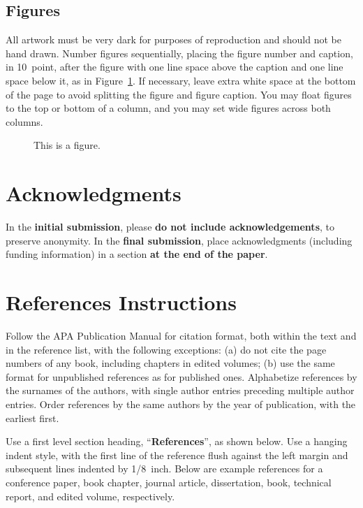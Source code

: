 \documentclass[10pt,letterpaper]{article}
\begin{document}
\subsection{Figures}

All artwork must be very dark for purposes of reproduction and should
not be hand drawn. Number figures sequentially, placing the figure
number and caption, in 10~point, after the figure with one line space
above the caption and one line space below it, as in
Figure~\ref{sample-figure}. If necessary, leave extra white space at
the bottom of the page to avoid splitting the figure and figure
caption. You may float figures to the top or bottom of a column, and
you may set wide figures across both columns.

\begin{figure}[H]
\begin{center}
\end{center}
\caption{This is a figure.} 
\label{sample-figure}
\end{figure}


\section{Acknowledgments}

In the \textbf{initial submission}, please \textbf{do not include
  acknowledgements}, to preserve anonymity.  In the \textbf{final submission},
place acknowledgments (including funding information) in a section \textbf{at
the end of the paper}.


\section{References Instructions}

Follow the APA Publication Manual for citation format, both within the
text and in the reference list, with the following exceptions: (a) do
not cite the page numbers of any book, including chapters in edited
volumes; (b) use the same format for unpublished references as for
published ones. Alphabetize references by the surnames of the authors,
with single author entries preceding multiple author entries. Order
references by the same authors by the year of publication, with the
earliest first.

Use a first level section heading, ``{\bf References}'', as shown
below. Use a hanging indent style, with the first line of the
reference flush against the left margin and subsequent lines indented
by 1/8~inch. Below are example references for a conference paper, book
chapter, journal article, dissertation, book, technical report, and
edited volume, respectively.

\nocite{ChalnickBillman1988a}
\nocite{Feigenbaum1963a}
\nocite{Hill1983a}
\nocite{OhlssonLangley1985a}
\nocite{Matlock2001}
\nocite{NewellSimon1972a}
\nocite{ShragerLangley1990a}




\setlength{\bibleftmargin}{.125in}
\setlength{\bibindent}{-\bibleftmargin}


\end{document}
